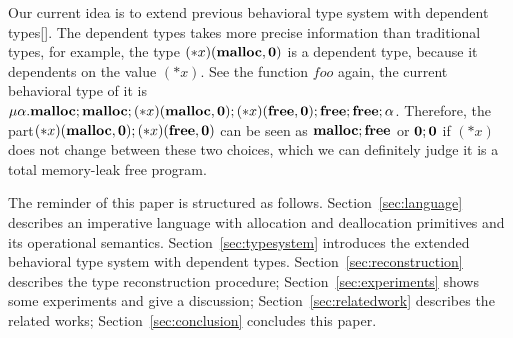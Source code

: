 Our current idea is to extend previous behavioral type system with
dependent types[]. The dependent types takes more precise information
than traditional types, for example, the type
\((*x)(\mathbf{malloc}, \mathbf{0})\) is a dependent type, because it dependents
on the value \((*x)\). See the function \(foo\) again, the current
behavioral type of it is \(
\mu\alpha.\mathbf{malloc};\mathbf{malloc};(*x)(\mathbf{malloc}, \mathbf{0});(*x)(\mathbf{free}, \mathbf{0});\mathbf{free};\mathbf{free};\alpha
\). Therefore, the part\((*x)(\mathbf{malloc}, \mathbf{0});(*x)(\mathbf{free}, \mathbf{0})\)
can be seen as \(\mathbf{malloc};\mathbf{free}\) or \(\mathbf{0};\mathbf{0}\) if \((*x)\) does
not change between these two choices, which we can definitely judge it
is a total memory-leak free program.

The reminder of this paper is structured as
follows. Section~\ref{sec:language} describes an imperative language
with allocation and deallocation primitives and its operational
semantics. Section~\ref{sec:typesystem} introduces the extended
behavioral type system with dependent
types. Section~\ref{sec:reconstruction} describes the type
reconstruction procedure; Section~\ref{sec:experiments} shows some
experiments and give a discussion; Section~\ref{sec:relatedwork}
describes the related works; Section~\ref{sec:conclusion} concludes
this paper.
